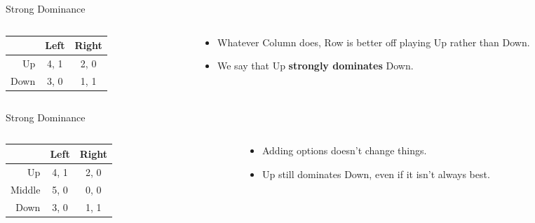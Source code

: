 \documentclass[
  14pt,
  letterpaper,
  ignorenonframetext,
  aspectratio=169,
]{beamer}
\providecommand{\tightlist}{%
  \setlength{\itemsep}{0pt}\setlength{\parskip}{0pt}}\usepackage{longtable,booktabs,array}
\let\olditem\item
\renewcommand{\item}{%
\olditem\vspace{6pt}}
\begin{document}
\begin{frame}{Strong Dominance}
\protect\hypertarget{strong-dominance}{}
\begin{columns}[T]
\begin{column}{0.4\textwidth}
\begin{table}[!h]
\centering
\begin{tabular}[t]{>{}r|cc}
\toprule
 & Left & Right\\
\midrule
Up & 4, 1 & 2, 0\\
Down & 3, 0 & 1, 1\\
\bottomrule
\end{tabular}
\end{table}
\end{column}

\begin{column}{0.6\textwidth}
\begin{itemize}[<+->]
\tightlist
\item
  Whatever Column does, Row is better off playing Up rather than Down.
\item
  We say that Up \textbf{strongly dominates} Down.
\end{itemize}
\end{column}
\end{columns}
\end{frame}

\begin{frame}[fragile]{Strong Dominance}
\protect\hypertarget{strong-dominance-1}{}
\begin{columns}[T]
\begin{column}{0.4\textwidth}
\begin{table}[!h]
\centering
\begin{tabular}[t]{>{}r|cc}
\toprule
 & Left & Right\\
\midrule
Up & 4, 1 & 2, 0\\
Middle & 5, 0 & 0, 0\\
Down & 3, 0 & 1, 1\\
\bottomrule
\end{tabular}
\end{table}
\end{column}

\begin{column}{0.6\textwidth}
\begin{itemize}[<+->]
\tightlist
\item
  Adding options doesn't change things.
\item
  Up still dominates Down, even if it isn't always best.
\end{itemize}
\end{column}
\end{columns}
\end{frame}
\end{document}
